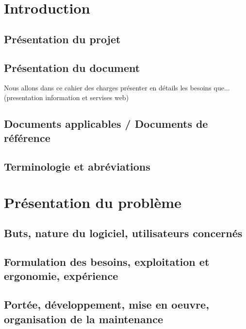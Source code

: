 \section{Introduction}

\subsection{Présentation du projet}


\subsection{Présentation du document}

Nous allons dans ce cahier des charges présenter en détails les besoins que... (presentation information et servises web)

\subsection{Documents applicables / Documents de référence}


\subsection{Terminologie et abréviations}


\section{Présentation du problème}

\subsection{Buts, nature du logiciel, utilisateurs concernés}


\subsection{Formulation des besoins, exploitation et ergonomie, expérience}


\subsection{Portée, développement, mise en oeuvre, organisation de la maintenance}



